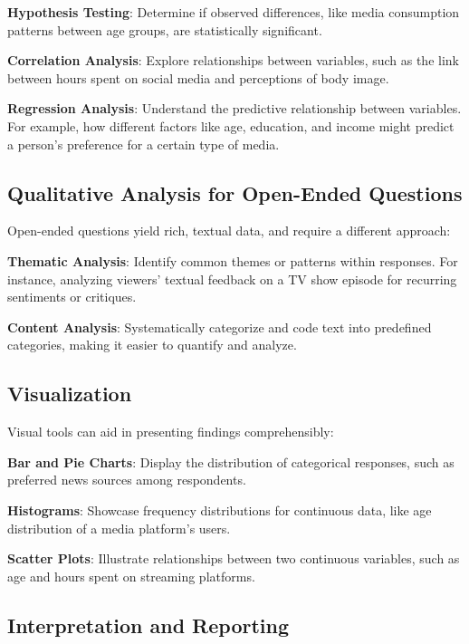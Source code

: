 \documentclass[
  b5paper]{book}
\begin{document}
\textbf{Hypothesis Testing}: Determine if observed differences, like media consumption patterns between age groups, are statistically significant.

\textbf{Correlation Analysis}: Explore relationships between variables, such as the link between hours spent on social media and perceptions of body image.

\textbf{Regression Analysis}: Understand the predictive relationship between variables.
For example, how different factors like age, education, and income might predict a person's preference for a certain type of media.

\hypertarget{qualitative-analysis-for-open-ended-questions}{%
\subsection*{Qualitative Analysis for Open-Ended Questions}\label{qualitative-analysis-for-open-ended-questions}}

Open-ended questions yield rich, textual data, and require a different approach:

\textbf{Thematic Analysis}: Identify common themes or patterns within responses.
For instance, analyzing viewers' textual feedback on a TV show episode for recurring sentiments or critiques.

\textbf{Content Analysis}: Systematically categorize and code text into predefined categories, making it easier to quantify and analyze.

\hypertarget{visualization}{%
\subsection*{Visualization}\label{visualization}}

Visual tools can aid in presenting findings comprehensibly:

\textbf{Bar and Pie Charts}: Display the distribution of categorical responses, such as preferred news sources among respondents.

\textbf{Histograms}: Showcase frequency distributions for continuous data, like age distribution of a media platform's users.

\textbf{Scatter Plots}: Illustrate relationships between two continuous variables, such as age and hours spent on streaming platforms.

\hypertarget{interpretation-and-reporting}{%
\subsection*{Interpretation and Reporting}\label{interpretation-and-reporting}}
\end{document}
